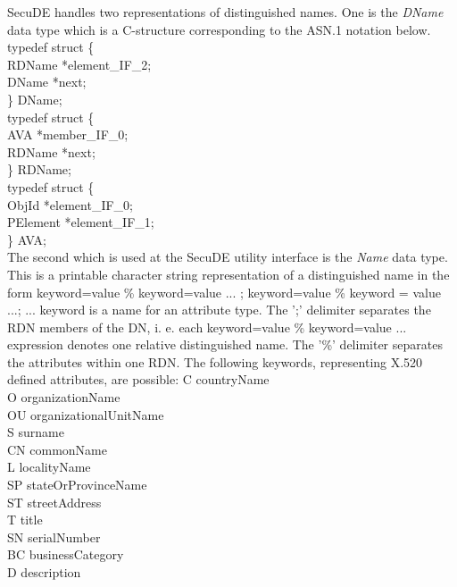 SecuDE handles two representations of distinguished names. One is the {\em DName}
data type which is a C-structure corresponding to the ASN.1 notation below. 
{\small
\bvtab
\2 typedef struct \{                            \\
\4        RDName       \3 *element\_IF\_2;      \\
\4        DName        \3 *next;                \\
\2 \} DName;                                    \\ [1em]
\2 typedef struct \{                            \\
\4        AVA          \3 *member\_IF\_0;       \\
\4        RDName       \3 *next;                \\
\2 \} RDName;                                   \\ [1em]
\2 typedef struct \{                            \\ 
\4        ObjId  \3 *element\_IF\_0;      \\
\4        PElement     \3 *element\_IF\_1;      \\
\2 \} AVA;                                      \\
\evtab
}
The second which is used at the SecuDE utility interface is the {\em Name} data type.
This is a printable character string representation
of a distinguished name in the form
\bc
{\small keyword=value \% keyword=value ... ; keyword=value \% keyword = value ...; ...}
\ec
keyword is a name for an attribute type. 
The ';' delimiter separates the RDN members of the DN, i. e. each 
keyword=value \% keyword=value ... expression denotes one relative distinguished name.
The '\%' delimiter separates the attributes within one RDN.
The following keywords, representing X.520 defined attributes,  are possible:
{\small
\bvtab
C   \2 countryName \\
O   \2 organizationName  \\
OU  \2 organizationalUnitName \\
S   \2 surname \\
CN  \2 commonName \\
L   \2 localityName \\
SP  \2 stateOrProvinceName \\
ST  \2 streetAddress \\
T   \2 title \\
SN  \2 serialNumber \\
BC  \2 businessCategory \\
D   \2 description 
\evtab
}
